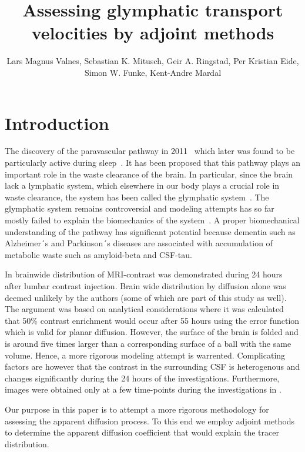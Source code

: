 \documentclass[11pt,a4paper]{article}
\title{Assessing glymphatic transport velocities by adjoint methods}
\author{Lars Magnus Valnes, Sebastian K. Mitusch, Geir A. Ringstad, Per Kristian Eide, Simon W. Funke, Kent-Andre Mardal }
\begin{document}
\maketitle

\begin{abstract}
\end{abstract}
\section{Introduction}

The discovery of the paravascular pathway in 2011~\cite{iliff2012paravascular} which later was found to be particularly active during sleep~\cite{xie2013sleep}. 
It has been proposed that this pathway plays an important role in the waste
clearance of the brain. In particular, since the brain lack a lymphatic system, 
which elsewhere in our body plays a crucial role in waste clearance, the system has been called the glymphatic system~\cite{jessen2015glymphatic}.  
The glymphatic system remains controversial and modeling attempts
has so far mostly failed to explain the biomechanics of the system~\cite{holter2017interstitial, smith2017glymphatic}. A proper biomechanical 
understanding of the pathway has significant potential because
dementia such as Alzheimer´s and Parkinson´s diseases are
associated with accumulation of metabolic waste such as
amyloid-beta and CSF-tau.  

In \cite{ringstad2018brain} brainwide distribution of MRI-contrast was demonstrated during 24 hours after lumbar contrast injection. Brain wide distribution by diffusion alone was deemed unlikely by the authors (some of which are part 
of this study as well). The argument was based on analytical considerations where it was calculated that 50\% contrast enrichment would occur after 
55 hours using the error function which is valid for planar diffusion. However, 
the surface of the brain is folded and is around five times larger than 
a corresponding surface of a ball with the same volume. Hence, 
a more rigorous modeling attempt is warrented. Complicating factors
are however that the contrast in the surrounding CSF is heterogenous
and changes significantly during the 24 hours of the investigations. 
Furthermore, images were obtained only at a few time-points during the investigations in \cite{ringstad2018brain}.  

Our purpose in this paper is to attempt a more rigorous methodology 
for assessing the apparent diffusion process. To this end we employ
adjoint methods to determine the apparent diffusion coefficient 
that would explain the tracer distribution.  
  
\end{document}
